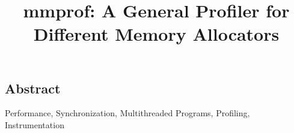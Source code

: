 \documentclass[preprint,10pt]{sigplanconf}
\begin{document}
\setlength{\pdfpageheight}{\paperheight}
\setlength{\pdfpagewidth}{\paperwidth}

\title{mmprof: A General Profiler for Different Memory Allocators}

\authorinfo{}


\maketitle

\subsection*{Abstract}



\keywords
Performance, Synchronization, Multithreaded Programs, Profiling, Instrumentation


%










{


}
\end{document}

